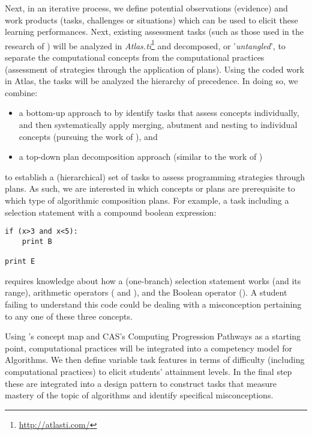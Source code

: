 Next, in an iterative process, we define potential observations (evidence) and work products (tasks, challenges or situations) which can be used to elicit these learning performances. Next, existing assessment tasks (such as those used in the research of \citeauthor{LuxtonReilly2018}) will be analyzed in \emph{Atlas.ti}\footnote{\url{http://atlasti.com/}} and decomposed, or '\emph{untangled}', to separate the computational concepts from the computational practices (assessment of strategies through the application of plans). Using the coded work in Atlas, the tasks will be analyzed the hierarchy of precedence. In doing so, we combine:
\begin{itemize}
\item a bottom-up approach to by identify tasks that assess concepts individually, and then systematically apply merging, abutment and nesting to individual concepts (pursuing the work of \citeauthor{deRaadt2009teachingPlans}), and
\item a top-down plan decomposition approach (similar to the work of \citeauthor{LuxtonReilly2018})
\end{itemize}
to establish a (hierarchical) set of tasks to assess programming strategies through plans. As such, we are interested in which concepts or plans are prerequisite to which type of algorithmic composition plans. For example, a task including a selection statement with a compound boolean expression:
\begin{verbatim}
if (x>3 and x<5):
    print B

print E
\end{verbatim}
requires knowledge about how a (one-branch) selection statement works (and its range), arithmetic operators (\jav{<} and \jav{>}), and the Boolean operator (). A student failing to understand this code could be dealing with a misconception pertaining to any one of these three concepts.

Using \citeauthor{LuxtonReilly2018}'s concept map and CAS's Computing Progression Pathways \cite{CASProgressionPathways} as a starting point, computational practices will be integrated into a competency model for Algorithms. We then define variable task features in terms of difficulty (including computational practices) to elicit students' attainment levels. In the final step these are integrated into a design pattern to construct tasks that measure mastery of the topic of algorithms and identify specifical misconceptions.



